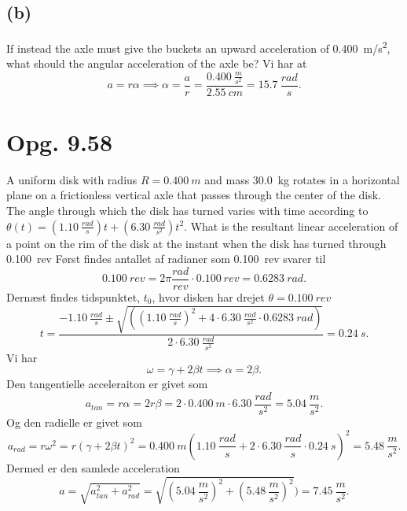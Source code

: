 \documentclass[12pt]{article}
\begin{document}
\subsection*{(b)}
If instead the axle must give the buckets an upward acceleration of \qty{0,400}{m/s^2}, what should the angular acceleration of the axle be?
Vi har at
\[
a = r\alpha \implies \alpha = \frac{a}{r} = \frac{\qty{0,400}{\frac{m}{s^2}}}{\qty{2,55}{cm}} = \qty{15,7}{\frac{rad}{s}}
.\] 


\section*{Opg. 9.58}
A uniform disk with radius $R = \qty{0,400}{m}$ and mass \qty{30,0}{kg} rotates in a horizontal plane on a frictionless vertical axle that passes through the center of the disk. The angle through which the disk has turned varies with time according to $\theta(t) = \left( \qty{1,10}{\frac{rad}{s}} \right)t + \left( \qty{6,30}{\frac{rad}{s^2}} \right)t^2$. What is the resultant linear acceleration of a point on the rim of the disk at the instant when the disk has turned through \qty{0,100}{rev}
\bigbreak
Først findes antallet af radianer som \qty{0,100}{rev} svarer til
\[
  \qty{0,100}{rev} = 2\pi \unit{\frac{rad}{rev}} \cdot \qty{0,100}{rev} = \qty{0,6283}{rad}
.\] 
Dernæst findes tidspunktet, $t_{0}$, hvor disken har drejet $\theta = \qty{0,100}{rev}$
\[
t = \frac{\qty{-1,10}{\frac{rad}{s}} \pm \sqrt{\left( \left( \qty{1,10}{\frac{rad}{s}} \right)^2 + 4\cdot \qty{6,30}{\frac{rad}{s^2}} \cdot \qty{0,6283}{rad} \right)}}{2\cdot \qty{6,30}{\frac{rad}{s^2}}} = \qty{0,24}{s} 
.\] 
Vi har
\[
\omega = \gamma + 2\beta t \implies \alpha = 2 \beta
.\] 
Den tangentielle acceleraiton er givet som
\[
a_{tan} = r \alpha = 2r \beta = 2 \cdot  \qty{0,400}{m} \cdot \qty{6,30}{\frac{rad}{s^2}} = \qty{5,04}{\frac{m}{s^2}} 
.\] 
Og den radielle er givet som
\[
a_{rad} = r\omega^2 = r \left( \gamma + 2\beta t \right)^2 = \qty{0,400}{m} \left( \qty{1,10}{\frac{rad}{s}} + 2\cdot  \qty{6,30}{\frac{rad}{s}} \cdot \qty{0,24}{s}\right)^2 = \qty{5,48}{\frac{m}{s^2}}
.\] 
Dermed er den samlede acceleration
\[
a = \sqrt{a_{tan}^2 + a_{rad}^2}  = \sqrt{\left( \qty{5,04}{\frac{m}{s^2}} \right)^2 + \left( \qty{5,48}{\frac{m}{s^2}} \right)^2}  ) = \qty{7,45}{\frac{m}{s^2}} 
.\] 
\end{document}
